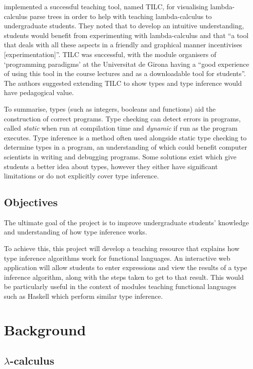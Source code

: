 \documentclass[a4paper,fleqn,12pt]{article}
\begin{document}
\cite{ref9} implemented a successful teaching tool, named TILC, for visualising lambda-calculus parse trees in order to help with teaching lambda-calculus to undergraduate students. They noted that to develop an intuitive understanding, students would benefit from  experimenting with lambda-calculus and that “a tool that deals with all these aspects in a friendly and graphical manner incentivises [experimentation]”. TILC was successful, with the module organisers of ‘programming paradigms’ at the Universitat de Girona having a “good experience of using this tool in the course lectures and as a downloadable tool for students”. The authors suggested extending TILC to show types and type inference would have pedagogical value.

To summarise, types (such as integers, booleans and functions) aid the construction of correct programs. Type checking can detect errors in programs, called \textit{static} when run at compilation time and \textit{dynamic} if run as the program executes. Type inference is a method often used alongside static type checking to determine types in a program, an understanding of which could benefit computer scientists in writing and debugging programs. Some solutions exist which give students a better idea about types, however they either have significant limitations or do not explicitly cover type inference.

\subsection{Objectives}\label{id:h.o72kh3tf0r5l}

The ultimate goal of the project is to improve undergraduate students’ knowledge and understanding of how type inference works.

To achieve this, this project will develop a teaching resource that explains how type inference algorithms work for functional languages. An interactive web application will allow students to enter expressions and view the results of a type inference algorithm, along with the steps taken to get to that result. This would be particularly useful in the context of modules teaching functional languages such as Haskell which perform similar type inference.

\section{Background}\label{id:h.ebjyqi73zdyo}

\subsection{$\lambda$-calculus}\label{id:h.odw4vku9eizz}
\end{document}
